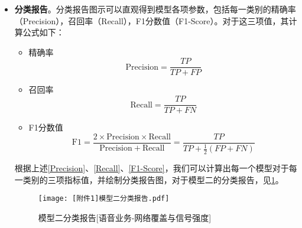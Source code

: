 \documentclass{MathorCupmodeling}
\begin{document}
\begin{itemize}
		\item \textbf{分类报告}。分类报告图示可以直观得到模型各项参数，包括每一类别的精确率（Precision），召回率（Recall），F1分数值（F1-Score）。对于这三项值，其计算公式如下：
		\begin{itemize}
			\item {\heiti 精确率}
			\begin{equation}
				\mathrm{Precision} = \frac{TP}{TP+FP} \label{Precision}
			\end{equation}
			\item {\heiti 召回率}
			\begin{equation}
				\mathrm{Recall} = \frac{TP}{TP+FN} \label{Recall}
			\end{equation}
			\item {\heiti F1分数值} 
			\begin{equation}
				\mathrm{F}1 = \frac{2\times \mathrm{Precision}\times \mathrm{Recall}}{\mathrm{Precision}+\mathrm{Recall}}=\frac{TP}{TP+\frac{1}{2}\left(FP+FN\right)} \label{F1-Score}
			\end{equation}
		\end{itemize}
		根据上述\textcolor{blue}{\eqref{Precision}}、\textcolor{blue}{\eqref{Recall}}、\textcolor{blue}{\eqref{F1-Score}}，我们可以计算出每一个模型对于每一类别的三项指标值，并绘制分类报告图，对于模型二的分类报告，见\textcolor{blue}{\cref{fig:SecondModelClassificationReport}}。
		\begin{figure}[htbp]
			\centerline{\texttt{[image: [附件1]模型二分类报告.pdf]}}
			\caption{模型二分类报告[语音业务-网络覆盖与信号强度]}\label{fig:SecondModelClassificationReport}
		\end{figure}


\end{itemize}
\end{document}
